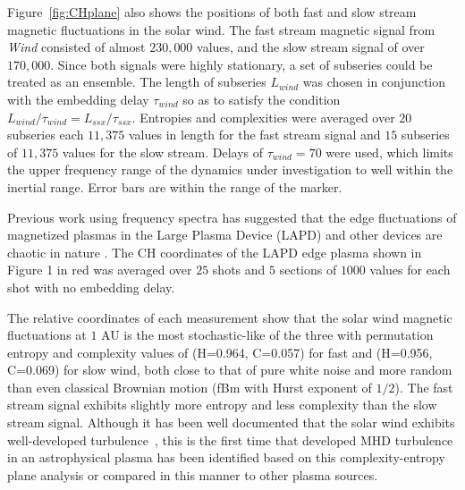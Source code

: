 \documentclass[aps,pre,twocolumn,secnumarabic,nobalancelastpage,amsmath,amssymb,
nofootinbib]{revtex4-1}
\begin{document}


Figure~\ref{fig:CHplane} also shows the positions of both fast and slow stream magnetic fluctuations in the solar wind.  The fast stream magnetic signal from \textit{Wind} consisted of almost $230,000$ values, and the slow stream signal of over $170,000$. Since both signals were highly stationary, a set of subseries could be treated as an ensemble. The length of subseries $L_{wind}$ was chosen in conjunction with the embedding delay $\tau_{wind}$ so as to satisfy the condition $L_{wind}/\tau_{wind} = L_{ssx}/\tau_{ssx}$. Entropies and complexities were averaged over $20$ subseries each $11,375$ values in length for the fast stream signal and $15$ subseries of $11,375$ values for the slow stream. Delays of $\tau_{wind} = 70$ were used, which limits the  upper frequency range of the dynamics under investigation to well within the inertial range. Error bars are within the range of the marker.

Previous work using frequency spectra has suggested that the edge fluctuations of magnetized plasmas in the Large Plasma Device (LAPD) and other devices are chaotic in nature \cite{maggs2012}. The CH coordinates of the LAPD edge plasma shown in Figure 1 in red was averaged over $25$ shots and $5$ sections of $1000$ values for each shot with no embedding delay. 

The relative coordinates of each measurement show that the solar wind magnetic fluctuations at $1$ AU is the most stochastic-like of the three with permutation entropy and complexity values of (H=0.964, C=0.057) for fast and (H=0.956, C=0.069) for slow wind, both close to that of pure white noise and more random than even classical Brownian motion (fBm with Hurst exponent of $1/2$). The fast stream signal exhibits slightly more entropy and less complexity than the slow stream signal. Although it has been well documented that the solar wind exhibits well-developed turbulence~\cite{bruno2013}, this is the first time that developed MHD turbulence in an astrophysical plasma has been identified based on this complexity-entropy plane analysis or compared in this manner to other plasma sources.
\end{document}
